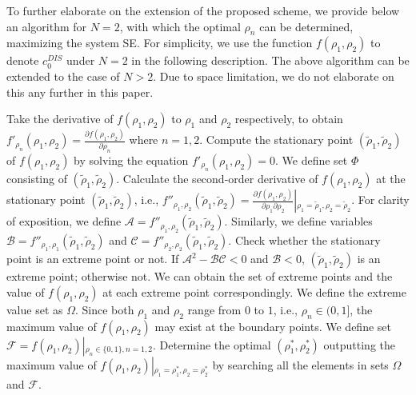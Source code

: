 \documentclass[10pt, conference, letterpaper]{IEEEtran}
\begin{document}
To further elaborate on the extension of the proposed scheme,
we provide below an algorithm for $N=2$,
with which the optimal $\rho_{n}$ can be determined,
maximizing the system SE.
For simplicity, we use the function $f(\rho_{1},\rho_{2})$
to denote $c^{DIS}_{0}$ under $N=2$ in the following description.
The above algorithm can be extended to the case of $N>2$.
Due to space limitation, we do not elaborate on this any further in this paper.
\begin{algorithm}[!htb]%
\caption{\small{}}
\begin{algorithmic}[1]
\STATE Take the derivative of $f(\rho_{1},\rho_{2})$ to $\rho_{1}$ and $\rho_{2}$ respectively,
to obtain $f'_{\rho_{n}}(\rho_{1},\rho_{2})=\frac{\partial f(\rho_{1},\rho_{2})}{\partial\rho_{n}}$ where $n=1,2$.
\STATE Compute the stationary point $(\tilde{\rho}_{1},\tilde{\rho}_{2})$ of $f(\rho_{1},\rho_{2})$ by solving the equation $f'_{\rho_{n}}(\rho_{1},\rho_{2})=0$. We define set $\Phi$ consisting of $(\tilde{\rho}_{1},\tilde{\rho}_{2})$.
\STATE Calculate the second-order derivative of $f(\rho_{1},\rho_{2})$
at the stationary point $(\tilde{\rho}_{1},\tilde{\rho}_{2})$, i.e.,
$f''_{\rho_{1},\rho_{2}}(\tilde{\rho}_{1},\tilde{\rho}_{2})=
\frac{\partial f(\rho_{1},\rho_{2})}{\partial\rho_{1} \partial\rho_{2}}\left|_{\rho_{1}=\tilde{\rho}_{1},\rho_{2}
=\tilde{\rho}_{2}}\right.$. For clarity of exposition, we define $\mathcal{A}=f''_{\rho_{1},\rho_{2}}(\tilde{\rho}_{1},\tilde{\rho}_{2})$.
Similarly, we define variables $\mathcal{B}=f''_{\rho_{1},\rho_{1}}(\tilde{\rho}_{1},\tilde{\rho}_{2})$ and
$\mathcal{C}=f''_{\rho_{2},\rho_{2}}(\tilde{\rho}_{1},\tilde{\rho}_{2})$.
\STATE Check whether the stationary point is an extreme point or not.
If $\mathcal{A}^{2}-\mathcal{BC}<0$ and $\mathcal{B}<0$, $(\tilde{\rho}_{1},\tilde{\rho}_{2})$ is an extreme point; otherwise not.
We can obtain the set of extreme points and the value of $f(\rho_{1},\rho_{2})$ at each extreme point correspondingly.
We define the extreme value set as $\Omega$.
\STATE Since both $\rho_{1}$ and $\rho_{2}$ range from $0$ to $1$,
i.e., $\rho_{n}\in(0,1]$,
the maximum value of $f(\rho_{1},\rho_{2})$ may exist at the boundary points.
We define set $\mathcal{F}=f(\rho_{1},\rho_{2})\left|_{\rho_{n}\in\{0,1\}, n=1,2}\right.$.
\STATE Determine the optimal $(\rho^*_{1},\rho^*_{2})$ outputting the maximum value of
$f(\rho_{1},\rho_{2})\left|_{\rho_{1}=\rho^*_{1},\rho_{2}=\rho^*_{2}}\right.$
by searching all the elements in sets $\Omega$ and $\mathcal{F}$.
\end{algorithmic}
\end{algorithm}
\end{document}
